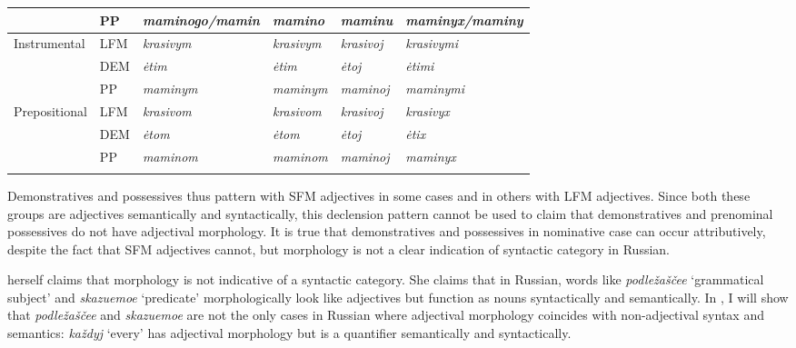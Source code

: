 \documentclass[output=paper,
colorlinks,
citecolor=brown,
newtxmath
]{langscibook}
\begin{document}
\begin{sidewaystable}
\begin{tabularx}{\textwidth}{X|X|XXX|X}
  &               PP          &       \textit{maminogo/mamin}     & \textit{mamino}    & \textit{maminu}    & \textit{maminyx/maminy}\\
  \midrule 
  Instrumental&   LFM         &       \textit{krasivym}           & \textit{krasivym}  & \textit{krasivoj}  & \textit{krasivymi}\\
  &               DEM         &       \textit{ėtim}               & \textit{ėtim}      & \textit{ėtoj}      & \textit{ėtimi}\\
  &               PP          &       \textit{maminym}            & \textit{maminym}   & \textit{maminoj}   & \textit{maminymi}\\
  \midrule
  Prepositional&  LFM         &       \textit{krasivom}           & \textit{krasivom}  & \textit{krasivoj}  & \textit{krasivyx}\\
  &               DEM         &       \textit{ėtom}               & \textit{ėtom}      & \textit{ėtoj}      & \textit{ėtix}\\
  &               PP          &       \textit{maminom}            & \textit{maminom}   & \textit{maminoj}   & \textit{maminyx}\\
  \lspbottomrule
\end{tabularx}
\end{sidewaystable}

Demonstratives and possessives thus pattern with SFM adjectives in some cases and in others with LFM adjectives. Since both these groups are adjectives semantically and syntactically, this declension pattern cannot be used to claim that demonstratives and prenominal possessives do not have adjectival morphology. It is true that demonstratives and possessives in nominative case can occur attributively, despite the fact that SFM adjectives cannot, but morphology is not a clear indication of syntactic category in Russian. 

\citet{Pereltsvaig2007} herself claims that morphology is not indicative of a syntactic category. She claims that in Russian, words like \textit{podležaščee} `grammatical subject' and \textit{skazuemoe} `predicate' morphologically look like adjectives but function as nouns syntactically and semantically. 
In , I will show that \textit{podležaščee} and \textit{skazuemoe} are not the only cases in Russian where adjectival morphology coincides with non-adjectival syntax and semantics:  \textit{každyj} `every' has adjectival morphology but is a quantifier semantically and syntactically.  
\end{document}
